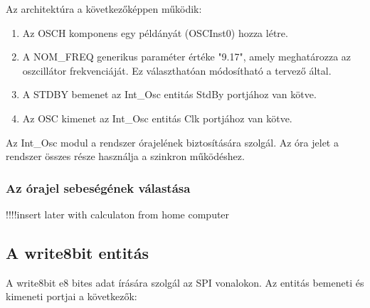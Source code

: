 \documentclass[a4paper,12pt,oneside]{book}
\begin{document}
Az architektúra a következőképpen működik:

\begin{enumerate}
	\item Az OSCH komponens egy példányát (OSCInst0) hozza létre.
	\item A NOM\_FREQ generikus paraméter értéke "9.17", amely meghatározza az oszcillátor frekvenciáját. Ez választhatóan módosítható a tervező által.
	\item A STDBY bemenet az Int\_Osc entitás StdBy portjához van kötve.
	\item Az OSC kimenet az Int\_Osc entitás Clk portjához van kötve.
\end{enumerate}

Az Int\_Osc modul a rendszer órajelének biztosítására szolgál. Az óra jelet a rendszer összes része használja a szinkron működéshez.

\subsubsection{Az órajel sebeségének válastása}
!!!!insert later with calculaton from home computer


\subsection{A write8bit entitás}
A write8bit e8 bites adat írására szolgál az SPI vonalokon. Az entitás bemeneti és kimeneti portjai a következők:
\end{document}
